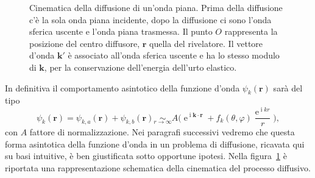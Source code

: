 \documentclass[a4paper,fleqn,twoside,12pt]{article}
\renewcommand{\phi}{\varphi}
\DeclareMathOperator{\e}{\mathrm{e}} %
\DeclareMathOperator{\uimm}{\mathrm{i}} %
\begin{document}
\begin{figure}
  \centering
  \caption{Cinematica della diffusione di un'onda piana.  Prima della diffusione
    c'è la sola onda piana incidente, dopo la diffusione ci sono l'onda sferica
    uscente e l'onda piana trasmessa.  Il punto $O$ rappresenta la posizione del
    centro diffusore, $\bm{r}$ quella del rivelatore.  Il vettore d'onda
    $\bm{k}'$ è associato all'onda sferica uscente e ha lo stesso modulo di
    $\bm{k}$, per la conservazione dell'energia dell'urto elastico.}
  \label{fig:cin-diffusione}
\end{figure}
In definitiva il comportamento asintotico della funzione d'onda
$\psi_{k}(\bm{r})$ sarà del tipo
\begin{equation}
  \label{eq:forma-asintotica}
  \psi_{k}(\bm{r}) = \psi_{k,a}(\bm{r}) + \psi_{k,b}(\bm{r}) \underset{r \to
    \infty}{\sim} A \bigg( \e^{\uimm \bm{k}\cdot\bm{r}} +
  f_{k}(\theta,\phi)\frac{\e^{\uimm kr}}{r} \bigg),
\end{equation}
con $A$ fattore di normalizzazione.  Nei paragrafi successivi vedremo che questa
forma asintotica della funzione d'onda in un problema di diffusione, ricavata
qui su basi intuitive, è ben giustificata sotto opportune ipotesi.  Nella
figura~\ref{fig:cin-diffusione} è riportata una rappresentazione schematica
della cinematica del processo diffusivo.
\end{document}
